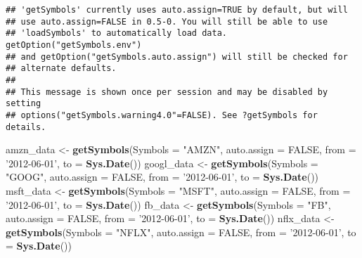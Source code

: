 \documentclass[]{article}
\newenvironment{Shaded}{\begin{snugshade}}{\end{snugshade}}
\newcommand{\DataTypeTok}[1]{\textcolor[rgb]{0.13,0.29,0.53}{#1}}
\newcommand{\KeywordTok}[1]{\textcolor[rgb]{0.13,0.29,0.53}{\textbf{#1}}}
\newcommand{\NormalTok}[1]{#1}
\newcommand{\OtherTok}[1]{\textcolor[rgb]{0.56,0.35,0.01}{#1}}
\newcommand{\StringTok}[1]{\textcolor[rgb]{0.31,0.60,0.02}{#1}}
\begin{document}
\begin{verbatim}
## 'getSymbols' currently uses auto.assign=TRUE by default, but will
## use auto.assign=FALSE in 0.5-0. You will still be able to use
## 'loadSymbols' to automatically load data. getOption("getSymbols.env")
## and getOption("getSymbols.auto.assign") will still be checked for
## alternate defaults.
## 
## This message is shown once per session and may be disabled by setting 
## options("getSymbols.warning4.0"=FALSE). See ?getSymbols for details.
\end{verbatim}

\begin{Shaded}
\begin{Highlighting}[]
\NormalTok{amzn_data <-}\StringTok{ }\KeywordTok{getSymbols}\NormalTok{(}\DataTypeTok{Symbols =} \StringTok{"AMZN"}\NormalTok{, }
                        \DataTypeTok{auto.assign =} \OtherTok{FALSE}\NormalTok{, }
                        \DataTypeTok{from =} \StringTok{'2012-06-01'}\NormalTok{, }
                        \DataTypeTok{to =} \KeywordTok{Sys.Date}\NormalTok{())}
\NormalTok{googl_data <-}\StringTok{ }\KeywordTok{getSymbols}\NormalTok{(}\DataTypeTok{Symbols =} \StringTok{"GOOG"}\NormalTok{,}
                        \DataTypeTok{auto.assign =} \OtherTok{FALSE}\NormalTok{,}
                        \DataTypeTok{from =} \StringTok{'2012-06-01'}\NormalTok{,}
                        \DataTypeTok{to =} \KeywordTok{Sys.Date}\NormalTok{())}
\NormalTok{msft_data <-}\StringTok{ }\KeywordTok{getSymbols}\NormalTok{(}\DataTypeTok{Symbols =} \StringTok{"MSFT"}\NormalTok{,}
                        \DataTypeTok{auto.assign =} \OtherTok{FALSE}\NormalTok{,}
                        \DataTypeTok{from =} \StringTok{'2012-06-01'}\NormalTok{,}
                        \DataTypeTok{to =} \KeywordTok{Sys.Date}\NormalTok{())}
\NormalTok{fb_data <-}\StringTok{ }\KeywordTok{getSymbols}\NormalTok{(}\DataTypeTok{Symbols =} \StringTok{"FB"}\NormalTok{,}
                      \DataTypeTok{auto.assign =} \OtherTok{FALSE}\NormalTok{,}
                      \DataTypeTok{from =} \StringTok{'2012-06-01'}\NormalTok{,}
                      \DataTypeTok{to =} \KeywordTok{Sys.Date}\NormalTok{())}
\NormalTok{nflx_data <-}\StringTok{ }\KeywordTok{getSymbols}\NormalTok{(}\DataTypeTok{Symbols =} \StringTok{"NFLX"}\NormalTok{,}
                      \DataTypeTok{auto.assign =} \OtherTok{FALSE}\NormalTok{,}
                      \DataTypeTok{from =} \StringTok{'2012-06-01'}\NormalTok{,}
                      \DataTypeTok{to =} \KeywordTok{Sys.Date}\NormalTok{())}



\end{Highlighting}
\end{Shaded}
\end{document}
